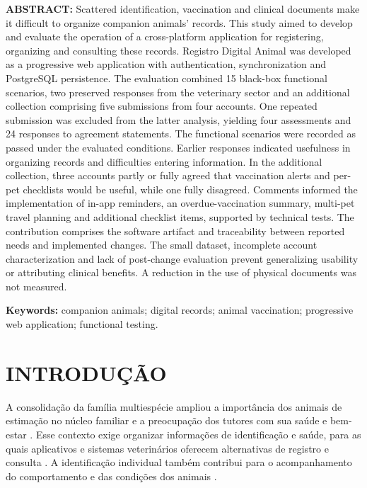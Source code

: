 \documentclass{UNESC}
\begin{document}
\vspace{1.0em}
\noindent
\textbf{ABSTRACT:} Scattered identification, vaccination and clinical documents make it difficult to organize companion animals' records. This study aimed to develop and evaluate the operation of a cross-platform application for registering, organizing and consulting these records. Registro Digital Animal was developed as a progressive web application with authentication, synchronization and PostgreSQL persistence. The evaluation combined 15 black-box functional scenarios, two preserved responses from the veterinary sector and an additional collection comprising five submissions from four accounts. One repeated submission was excluded from the latter analysis, yielding four assessments and 24 responses to agreement statements. The functional scenarios were recorded as passed under the evaluated conditions. Earlier responses indicated usefulness in organizing records and difficulties entering information. In the additional collection, three accounts partly or fully agreed that vaccination alerts and per-pet checklists would be useful, while one fully disagreed. Comments informed the implementation of in-app reminders, an overdue-vaccination summary, multi-pet travel planning and additional checklist items, supported by technical tests. The contribution comprises the software artifact and traceability between reported needs and implemented changes. The small dataset, incomplete account characterization and lack of post-change evaluation prevent generalizing usability or attributing clinical benefits. A reduction in the use of physical documents was not measured.

\vspace{0.5em}
\noindent
\textbf{Keywords:} companion animals; digital records; animal vaccination; progressive web application; functional testing.

\section{INTRODUÇÃO}

A consolidação da família multiespécie ampliou a importância dos animais de estimação no núcleo familiar e a preocupação dos tutores com sua saúde e bem-estar \cite{BOLSON2022,VIEIRA2020}. Esse contexto exige organizar informações de identificação e saúde, para as quais aplicativos e sistemas veterinários oferecem alternativas de registro e consulta \cite{MORAES2024}. A identificação individual também contribui para o acompanhamento do comportamento e das condições dos animais \cite{vidal2021}.
\end{document}
